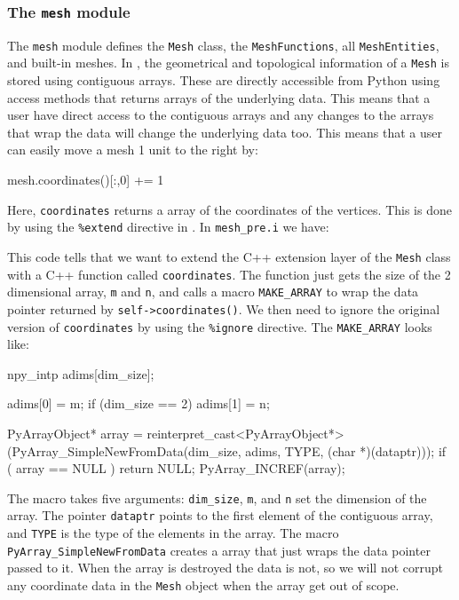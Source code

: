 \begin{code}
\subsubsection{The \texttt{mesh} module}
The \texttt{mesh} module defines the \texttt{Mesh} class, the \texttt{MeshFunctions}, all \texttt{MeshEntities}, and built-in meshes. In \dolfin,  the geometrical and topological information of a \texttt{Mesh} is stored using contiguous arrays. These are directly accessible from Python using access methods that returns \numpy arrays of the underlying data. This means that a user have direct access to the contiguous arrays and any changes to the \numpy arrays that wrap the data will change the underlying data too. This means that a user can easily move a mesh 1 unit to the right by:
\begin{code}
mesh.coordinates()[:,0] += 1
\end{code}
Here, \texttt{coordinates} returns a \numpy array of the coordinates of the vertices. This is done by using the \texttt{\%extend} directive in \swig. In \texttt{mesh\_pre.i} we have:
This code tells \swig that we want to extend the C++ extension layer of the \texttt{Mesh} class with a C++ function called \texttt{coordinates}. The function just gets the size of the 2 dimensional array, \texttt{m} and \texttt{n}, and calls a macro \texttt{MAKE\_}\texttt{ARRAY} to wrap the data pointer returned by \texttt{self->}\texttt{coordinates()}. We then need to ignore the original version of \texttt{coordinates} by using the \texttt{\%ignore} directive. The \texttt{MAKE\_}\texttt{ARRAY} looks like:
\begin{code}
  npy_intp adims[dim_size];

  adims[0] = m;
  if (dim_size == 2)
    adims[1] = n;

  PyArrayObject* array = reinterpret_cast<PyArrayObject*>(PyArray_SimpleNewFromData(dim_size, adims, TYPE, (char *)(dataptr)));
  if ( array == NULL ) return NULL;
  PyArray_INCREF(array);
\end{code}
The macro takes five arguments: \texttt{dim\_size}, \texttt{m}, and \texttt{n} set the dimension of the \numpy array. 
The pointer \texttt{dataptr} points to the first element of the contiguous array, and \texttt{TYPE} is the type of the elements in the array. The \numpy macro \texttt{PyArray\_}\texttt{SimpleNewFromData} creates a \numpy array that just wraps the data pointer passed to it. When the \numpy array is destroyed the data is not, so we will not corrupt any coordinate data in the \texttt{Mesh} object when the \numpy array get out of scope. \par


\end{code}
